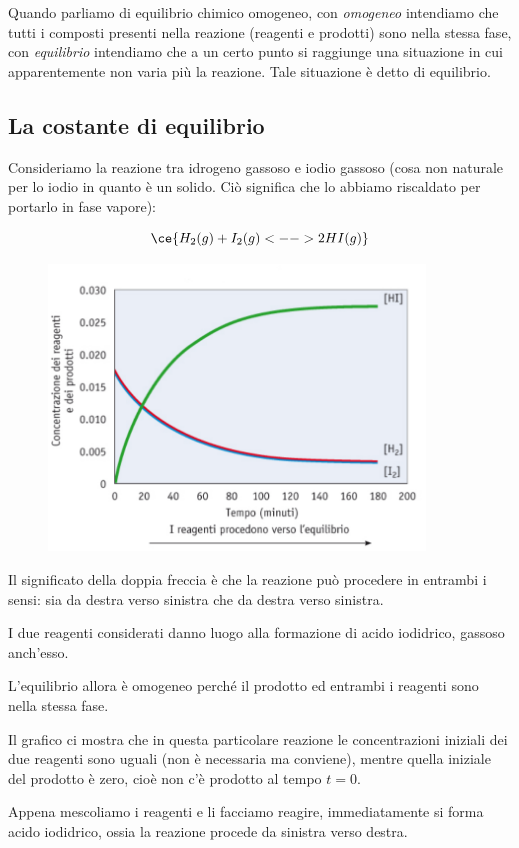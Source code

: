 Quando parliamo di equilibrio chimico omogeneo, con \textit{omogeneo} intendiamo che tutti i composti presenti nella reazione (reagenti e prodotti) sono nella stessa fase, con \textit{equilibrio} intendiamo che a un certo punto si raggiunge una situazione in cui apparentemente non varia più la reazione. Tale situazione è detto di equilibrio.
\subsection{La costante di equilibrio}
Consideriamo la reazione tra idrogeno gassoso e iodio gassoso (cosa non naturale per lo iodio in quanto è un solido. Ciò significa che lo abbiamo riscaldato per portarlo in fase vapore):

$$\ce{H_2(g) + I_2(g) <--> 2HI(g)}$$
\vspace{-1cm}\begin{figure}[htp]
    \centering
    \includegraphics[width=10cm]{immagini/equilibrio_chimico.png}
\end{figure}

Il significato della doppia freccia è che la reazione può procedere in entrambi i sensi: sia da destra verso sinistra che da destra verso sinistra.

I due reagenti considerati danno luogo alla formazione di acido iodidrico, gassoso anch'esso.

L'equilibrio allora è omogeneo perché il prodotto ed entrambi i reagenti sono nella stessa fase.

Il grafico ci mostra che in questa particolare reazione le concentrazioni iniziali dei due reagenti sono uguali (non è necessaria ma conviene), mentre quella iniziale del prodotto è zero, cioè non c'è prodotto al tempo $t=0$.

Appena mescoliamo i reagenti e li facciamo reagire, immediatamente si forma acido iodidrico, ossia la reazione procede da sinistra verso destra.

